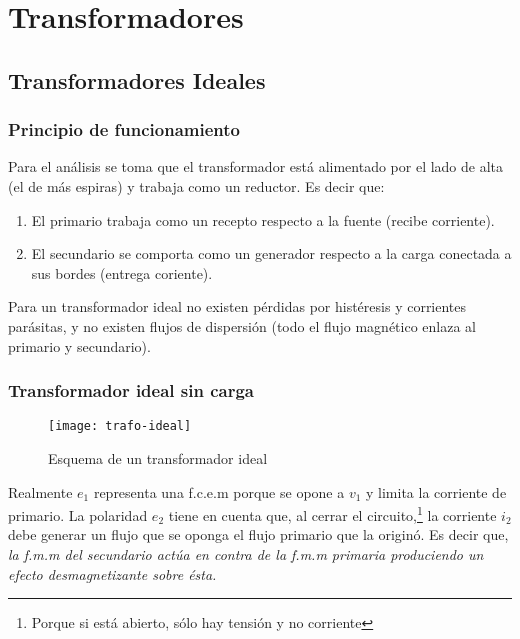 \section{Transformadores}
\label{sec:unidad-transformadores}
\subsection{Transformadores Ideales}
\subsubsection{Principio de funcionamiento}
Para el análisis se toma que el transformador está alimentado por el lado de alta (el de más espiras) y trabaja como un reductor. Es decir que:

\begin{enumerate}
	\item El primario trabaja como un recepto respecto a la fuente (recibe corriente).
	\item El secundario se comporta como un generador respecto a la carga conectada a sus bordes (entrega coriente).
\end{enumerate}

Para un transformador ideal no existen pérdidas por histéresis y corrientes parásitas, y no existen flujos de dispersión (todo el flujo magnético enlaza al primario y secundario).

\subsubsection{Transformador ideal sin carga}

\begin{figure}[h]
	\vspace{-1cm}
	\centering
	\texttt{[image: trafo-ideal]}
	\caption{Esquema de un transformador ideal}
	\label{fig:transformador-ideal}
\end{figure} 
 
 Realmente $e_{1}$ representa una f.c.e.m porque se opone a $v_{1}$ y limita la corriente de primario. La polaridad $e_{2}$ tiene en cuenta que, al cerrar el circuito,\footnote{Porque si está abierto, sólo hay tensión y no corriente} la corriente $i_{2}$ debe generar un flujo que se oponga el flujo primario que la originó. Es decir que, \textsl{la f.m.m del secundario actúa en contra de la f.m.m primaria produciendo un efecto desmagnetizante sobre ésta.}\\
 
